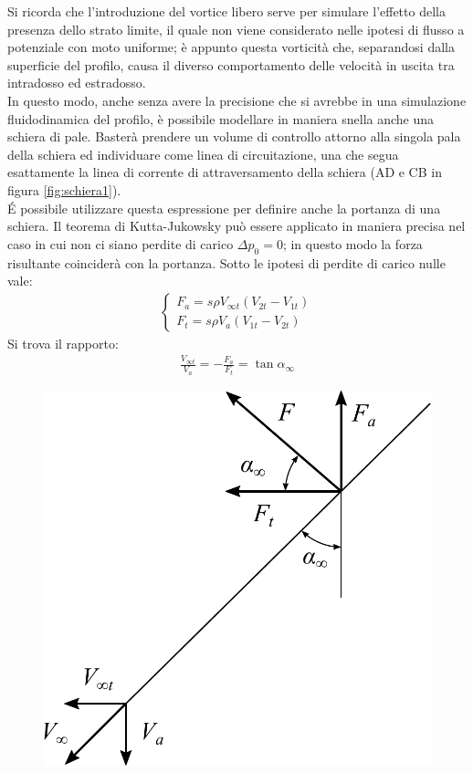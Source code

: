 Si ricorda che l'introduzione del vortice libero serve per simulare l'effetto della presenza dello strato limite, il quale non viene considerato nelle ipotesi di flusso a potenziale con moto uniforme; è appunto questa vorticità che, separandosi dalla superficie del profilo, causa il diverso comportamento delle velocità in uscita tra intradosso ed estradosso.\\
In questo modo, anche senza avere la precisione che si avrebbe in una simulazione fluidodinamica del profilo, è possibile modellare in maniera snella anche una schiera di pale. Basterà prendere un volume di controllo attorno alla singola pala della schiera ed individuare come linea di circuitazione, una che segua esattamente la linea di corrente di attraversamento della schiera (AD e CB in figura \ref{fig:schiera1}).\\
\'E possibile utilizzare questa espressione per definire anche la portanza di una schiera. Il teorema di Kutta-Jukowsky può essere applicato in maniera precisa nel caso in cui non ci siano perdite di carico $\Delta p_0=0$; in questo modo la forza risultante coinciderà con la portanza. Sotto le ipotesi di perdite di carico nulle vale:
\begin{align*}
\begin{cases}
F_a = s \rho V_{\infty t} (V_{2t}-V_{1t})\\
F_t = s \rho V_a (V_{1t}-V_{2t})
\end{cases}
\end{align*}
Si trova il rapporto:
\begin{align*}
	\frac{V_{\infty t}}{V_a}=-\frac{F_a}{F_t} = \tan \alpha_{\infty}
\end{align*}
\begin{figure}
	\centering
	\begin{minipage}{.4\textwidth}
		\centering
		\includegraphics[width=.95\linewidth]{fig/forzaKJ.pdf}
		\label{fig:forzaKJ}
	\end{minipage}
\end{figure}
